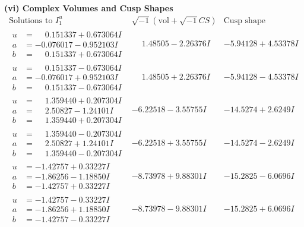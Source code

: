 \documentclass[1p]{elsarticle_modified}
\theoremstyle{definition}
\newcommand{\I}{\sqrt{-1}}
\begin{document}
\newpage\flushleft \textbf{(vi) Complex Volumes and Cusp Shapes}
$$\begin{array}{c|c|c}  
\text{Solutions to }I^u_{1}& \I (\text{vol} + \sqrt{-1}CS) & \text{Cusp shape}\\
 \hline 
\begin{aligned}
u &= \phantom{-}0.151337 + 0.673064 I \\
a &= -0.076017 - 0.952103 I \\
b &= \phantom{-}0.151337 + 0.673064 I\end{aligned}
 & \phantom{-}1.48505 - 2.26376 I & -5.94128 + 4.53378 I \\ \hline\begin{aligned}
u &= \phantom{-}0.151337 - 0.673064 I \\
a &= -0.076017 + 0.952103 I \\
b &= \phantom{-}0.151337 - 0.673064 I\end{aligned}
 & \phantom{-}1.48505 + 2.26376 I & -5.94128 - 4.53378 I \\ \hline\begin{aligned}
u &= \phantom{-}1.359440 + 0.207304 I \\
a &= \phantom{-}2.50827 - 1.24101 I \\
b &= \phantom{-}1.359440 + 0.207304 I\end{aligned}
 & -6.22518 - 3.55755 I & -14.5274 + 2.6249 I \\ \hline\begin{aligned}
u &= \phantom{-}1.359440 - 0.207304 I \\
a &= \phantom{-}2.50827 + 1.24101 I \\
b &= \phantom{-}1.359440 - 0.207304 I\end{aligned}
 & -6.22518 + 3.55755 I & -14.5274 - 2.6249 I \\ \hline\begin{aligned}
u &= -1.42757 + 0.33227 I \\
a &= -1.86256 - 1.18850 I \\
b &= -1.42757 + 0.33227 I\end{aligned}
 & -8.73978 + 9.88301 I & -15.2825 - 6.0696 I \\ \hline\begin{aligned}
u &= -1.42757 - 0.33227 I \\
a &= -1.86256 + 1.18850 I \\
b &= -1.42757 - 0.33227 I\end{aligned}
 & -8.73978 - 9.88301 I & -15.2825 + 6.0696 I \\ \hline\begin{aligned}

\end{aligned}
\end{array}$$
\end{document}

